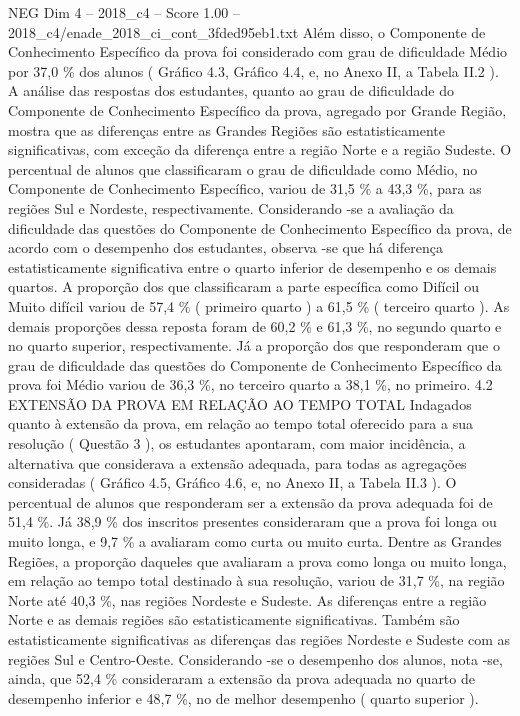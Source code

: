\begin{textsample}{NEG Dim 4 – 2018\_c4 – Score 1.00 – 2018\_c4/enade\_2018\_ci\_cont\_3fded95eb1.txt}
Além disso, o Componente de Conhecimento Específico da prova foi considerado com grau de dificuldade Médio por 37,0 \% dos alunos ( Gráfico 4.3, Gráfico 4.4, e, no Anexo II, a Tabela II.2 ).
A análise das respostas dos estudantes, quanto ao grau de dificuldade do Componente de Conhecimento Específico da prova, agregado por Grande Região, mostra que as diferenças entre as Grandes Regiões são estatisticamente significativas, com exceção da diferença entre a região Norte e a região Sudeste.
O percentual de alunos que classificaram o grau de dificuldade como Médio, no Componente de Conhecimento Específico, variou de 31,5 \% a 43,3 \%, para as regiões Sul e Nordeste, respectivamente.
Considerando -se a avaliação da dificuldade das questões do Componente de Conhecimento Específico da prova, de acordo com o desempenho dos estudantes, observa -se que há diferença estatisticamente significativa entre o quarto inferior de desempenho e os demais quartos.
A proporção dos que classificaram a parte específica como Difícil ou Muito difícil variou de 57,4 \% ( primeiro quarto ) a 61,5 \% ( terceiro quarto ).
As demais proporções dessa reposta foram de 60,2 \% e 61,3 \%, no segundo quarto e no quarto superior, respectivamente.
Já a proporção dos que responderam que o grau de dificuldade das questões do Componente de Conhecimento Específico da prova foi Médio variou de 36,3 \%, no terceiro quarto a 38,1 \%, no primeiro. 4.2 EXTENSÃO DA PROVA EM RELAÇÃO AO TEMPO TOTAL Indagados quanto à extensão da prova, em relação ao tempo total oferecido para a sua resolução ( Questão 3 ), os estudantes apontaram, com maior incidência, a alternativa que considerava a extensão adequada, para todas as agregações consideradas ( Gráfico 4.5, Gráfico 4.6, e, no Anexo II, a Tabela II.3 ).
O percentual de alunos que responderam ser a extensão da prova adequada foi de 51,4 \%.
Já 38,9 \% dos inscritos presentes consideraram que a prova foi longa ou muito longa, e 9,7 \% a avaliaram como curta ou muito curta.
Dentre as Grandes Regiões, a proporção daqueles que avaliaram a prova como longa ou muito longa, em relação ao tempo total destinado à sua resolução, variou de 31,7 \%, na região Norte até 40,3 \%, nas regiões Nordeste e Sudeste.
As diferenças entre a região Norte e as demais regiões são estatisticamente significativas.
Também são estatisticamente significativas as diferenças das regiões Nordeste e Sudeste com as regiões Sul e Centro-Oeste.
Considerando -se o desempenho dos alunos, nota -se, ainda, que 52,4 \% consideraram a extensão da prova adequada no quarto de desempenho inferior e 48,7 \%, no de melhor desempenho ( quarto superior ).

\end{textsample}
